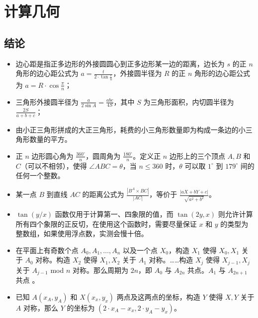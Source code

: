 \documentclass[a4paper,12pt]{article}
\begin{document}
\section{计算几何}

\subsection{结论}

\begin{itemize}
\item 边心距是指正多边形的外接圆圆心到正多边形某一边的距离，边长为 \( s \) 的正 \( n \) 角形的边心距公式为 \( a = \frac{t}{2 \cdot \tan \frac{\pi}{n}} \)，外接圆半径为 \( R \) 的正 \( n \) 角形的边心距公式为 \( a = R \cdot \cos \frac{\pi}{n} \)；

\item 三角形外接圆半径为 \( \frac{a}{2 \sin A} = \frac{abc}{4S} \)，其中 \( S \) 为三角形面积，内切圆半径为 \( \frac{2S}{a+b+c} \)；

\item 由小正三角形拼成的大正三角形，耗费的小三角形数量即为构成一条边的小三角形数量的平方。

\item 正 \( n \) 边形圆心角为 \( \frac{360^\circ}{n} \)，圆周角为 \( \frac{180^\circ}{n} \)。定义正 \( n \) 边形上的三个顶点 \( A, B \) 和 \( C \)（可以不相邻），使得 \( \angle ABC = \theta \)，当 \( n \leq 360 \) 时，\( \theta \) 可以取 \( 1^\circ \) 到 \( 179^\circ \) 间的任何一个整数。

\item 某一点 \( B \) 到直线 \( AC \) 的距离公式为 \( \frac{|B^A \times BC|}{|AC|} \)，等价于 \( \frac{|aX + bY + c|}{\sqrt{a^2 + b^2}} \)。

\item \( \tan(y / x) \) 函数仅用于计算第一、四象限的值，而 \( \tan(2y, x) \) 则允许计算所有四个象限的正反切，在使用这个函数时，需要尽量保证 \( x \) 和 \( y \) 的类型为整数组，如果使用浮点数，实测会慢十倍。

\item 在平面上有奇数个点 \( A_0, A_1, \ldots, A_n \) 以及一个点 \( X_0 \)，构造 \( X_1 \) 使得 \( X_0, X_1 \) 关于 \( A_0 \) 对称。构造 \( X_2 \) 使得 \( X_1, X_2 \) 关于 \( A_1 \) 对称。……构造 \( X_j \) 使得 \( X_{j-1}, X_j \) 关于 \( A_{j-1} \) mod \( n \) 对称。那么周期为 \( 2n \)，即 \( A_0 \) 与 \( A_{2n} \) 共点。\( A_1 \) 与 \( A_{2n+1} \) 共点 。

\item 已知 \( A(x_A, y_A) \) 和 \( X(x_x, y_x) \) 两点及这两点的坐标，构造 \( Y \) 使得 \( X, Y \) 关于 \( A \) 对称，那么 \( Y \) 的坐标为 \( (2 \cdot x_A - x_x, 2 \cdot y_A - y_x) \)。


\end{itemize}
\end{document}
